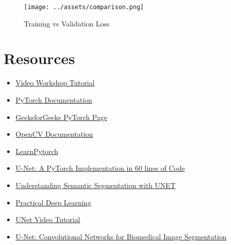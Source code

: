 \documentclass{article}
\begin{document}
\begin{figure}[htbp]
    \centering
    \texttt{[image: ../assets/comparison.png]}
    \caption{Training vs Validation Loss}
    \label{fig:training_vs_validation_loss}
\end{figure}

\section{Resources}
\begin{itemize}
    \item \href{https://youtu.be/UBzMgr6yfpw?si=xs_FN5irO61StvlF}{Video Workshop Tutorial}
    \item \href{https://pytorch.org/docs/stable/index.html}{PyTorch Documentation}
    \item \href{https://www.geeksforgeeks.org/pytorch/}{GeeksforGeeks PyTorch Page}
    \item \href{https://docs.opencv.org/master/}{OpenCV Documentation}
    \item \href{https://www.learnpytorch.io/}{LearnPytorch}
    \item \href{https://amaarora.github.io/posts/2020-09-13-unet.html}{U-Net: A PyTorch Implementation in 60 lines of Code}
    \item \href{https://towardsdatascience.com/understanding-semantic-segmentation-with-unet-6be4f42d4b47}{Understanding Semantic Segmentation with UNET}
    \item \href{https://course.fast.ai/}{Practical Deep Learning}
    \item \href{https://youtu.be/T0BiFBaMLDQ?si=x5QIm7DQiN6vbzwT}{UNet Video Tutorial}
    \item \href{https://arxiv.org/abs/1505.04597}{U-Net: Convolutional Networks for Biomedical Image Segmentation}
\end{itemize}
\end{document}
